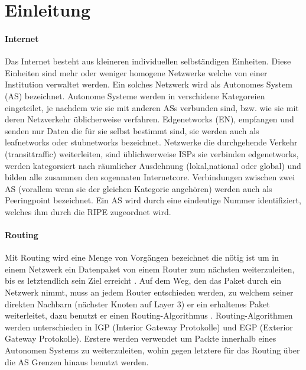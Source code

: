 \section{Einleitung}

\paragraph{Internet}
Das Internet besteht aus kleineren individuellen selbständigen Einheiten. Diese Einheiten sind mehr oder weniger homogene Netzwerke welche von einer Institution verwaltet werden. Ein solches Netzwerk wird als Autonomes System (AS) bezeichnet. Autonome Systeme werden in verschidene Kategoreien eingeteilet, je nachdem wie sie mit anderen ASs verbunden sind, bzw. wie sie mit deren Netzverkehr üblicherweise verfahren. Edgenetworks (EN), empfangen und senden nur Daten die für sie selbst bestimmt sind, sie werden auch als leafnetworks oder stubnetworks bezeichnet. Netzwerke die durchgehende Verkehr (transittraffic) weiterleiten, sind üblichwerweise ISPs sie verbinden edgenetworks, werden kategorsiert nach räumlicher Ausdehnung (lokal,national oder global) und bilden alle zusammen den sogennaten Internetcore. Verbindungen zwischen zwei AS (vorallem wenn sie der gleichen Kategorie angehören) werden auch als Peeringpoint bezeichnet. Ein AS wird durch eine eindeutige Nummer identifiziert, welches ihm durch die RIPE zugeordnet wird.

\paragraph{Routing}
Mit Routing wird eine Menge von Vorgängen bezeichnet die nötig ist um in einem Netzwerk ein Datenpaket von einem Router zum nächsten weiterzuleiten, bis es letztendlich sein Ziel erreicht \cite{Mahorta:2002:IR}. Auf dem Weg, den das Paket durch ein Netzwerk nimmt, muss an jedem Router entschieden werden, zu welchem seiner direkten Nachbarn (nächster Knoten auf Layer 3) er ein erhaltenes Paket weiterleitet, dazu benutzt er einen Routing-Algorithmus \cite{Tanenbaum:2003:CN}. Routing-Algorithmen werden unterschieden in IGP (Interior Gateway Protokolle) und EGP (Exterior Gateway Protokolle). Erstere werden verwendet um Packte innerhalb eines Autonomen Systems zu weiterzuleiten, wohin gegen letztere für das Routing über die AS Grenzen hinaus benutzt werden. 


